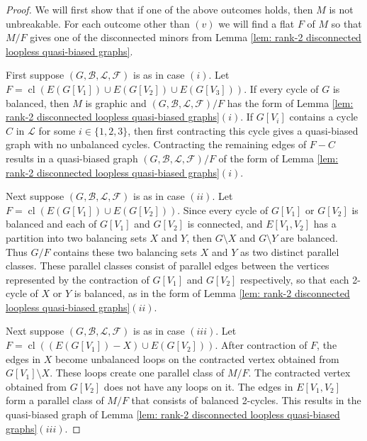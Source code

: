 \documentclass[12pt]{article}
\theoremstyle{definition}
\theoremstyle{plain} %
\newcommand{\cB}{\mathcal{B}}
\newcommand{\cF}{\mathcal{F}}
\newcommand{\cL}{\mathcal{L}}
\DeclareMathOperator{\cl}{cl}
\newcommand{\del}{\!\setminus\!}
\newcommand{\qbg}{\ensuremath{(G,\cB,\cL,\cF)}}
\begin{document}
\begin{proof}
We will first show that if one of the above outcomes holds, then $M$ is not unbreakable.
For each outcome other than $(v)$ we will find a flat $F$ of $M$ so that $M/F$ gives one of the disconnected minors from Lemma \ref{lem: rank-2 disconnected loopless quasi-biased graphs}. 

First suppose $(G,\cB, \cL,\cF)$ is as in case $(i)$. Let $F=\cl(E(G[V_1])\cup E(G[V_2])\cup E(G[V_3]))$. If every cycle of $G$ is balanced, then $M$ is graphic and $\qbg/F$ has the form of Lemma \ref{lem: rank-2 disconnected loopless quasi-biased graphs}$(i)$. If $G[V_i]$ contains a cycle $C$ in $\cL$ for some $i \in \{1,2,3\}$, then first contracting this cycle gives a quasi-biased graph with no unbalanced cycles. Contracting the remaining edges of $F-C$ results in a quasi-biased graph $\qbg/F$ of the form of Lemma \ref{lem: rank-2 disconnected loopless quasi-biased graphs}$(i)$.

Next suppose $(G,\cB, \cL,\cF)$ is as in case $(ii)$. Let $F=\cl(E(G[V_1]) \cup E(G[V_2]))$. Since every cycle of $G[V_1]$ or $G[V_2]$ is balanced and each of $G[V_1]$ and $G[V_2]$ is connected, and $E[V_1,V_2]$ has a partition into two balancing sets $X$ and $Y$, then $G\del X$ and $G\del Y$ are balanced. Thus $G/F$ contains these two balancing sets $X$ and $Y$ as two distinct parallel classes. These parallel classes consist of parallel edges between the vertices represented by the contraction of $G[V_1]$ and $G[V_2]$ respectively, so that each 2-cycle of $X$ or $Y$ is balanced, as in the form of Lemma \ref{lem: rank-2 disconnected loopless quasi-biased graphs}$(ii)$.

Next suppose $(G,\cB, \cL,\cF)$ is as in case $(iii)$. Let $F=\cl((E(G[V_1])- X) \cup E(G[V_2]))$. After contraction of $F$, the edges in $X$ become unbalanced loops on the contracted vertex obtained from $G[V_1]\del X$. These loops create one parallel class of $M/F$. The contracted vertex obtained from $G[V_2]$ does not have any loops on it. The edges in $E[V_1,V_2]$ form a parallel class of $M/F$ that consists of balanced 2-cycles. This results in the quasi-biased graph of Lemma \ref{lem: rank-2 disconnected loopless quasi-biased graphs}$(iii)$.


\end{proof}
\end{document}
